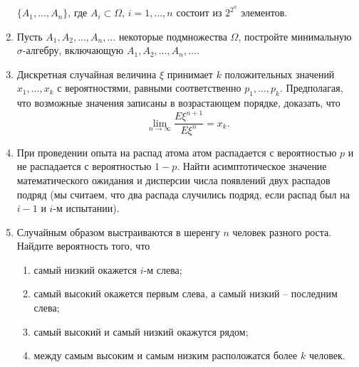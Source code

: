 \documentclass[a4paper, 14pt]{extarticle}
\begin{document}
\begin{enumerate}
	$\{A_1,\ldots, A_n\}$, где $A_i\subset\Omega$, $i = 1,\ldots, n$ состоит из $2^{2^n}$ элементов.
	\item Пусть $A_1,A_2,\ldots, A_n,\ldots$ некоторые подмножества $\Omega$, постройте минимальную $\sigma$-алгебру, включающую $A_1,A_2,\ldots, A_n,\ldots$.
	\item Дискретная случайная величина $\xi$ принимает $k$
	положительных значений $x_1,\ldots,x_k$ с вероятностями,
	равными соответственно $p_1,\ldots,p_k$. Предполагая, что
	возможные значения записаны в возрастающем порядке,
	доказать, что
	$$\lim_{n\rightarrow\infty}\frac{E\xi^{n+1}}{E\xi^n}=x_k. $$
	\item При проведении опыта на распад атома атом распадается с вероятностью $p$ и не распадается с вероятностью $1-p$. Найти асимптотическое значение математического ожидания и дисперсии числа появлений двух распадов подряд (мы считаем, что два распада случились подряд, если распад был на $i-1$ и $i$-м испытании).
	
\item Случайным образом выстраиваются в шеренгу $n$ человек разного
роста. Найдите вероятность того, что
\begin{enumerate}
	\item самый низкий окажется $i$-м слева;
	\item самый высокий окажется первым слева, а самый низкий -- последним слева;
	\item самый высокий и самый низкий окажутся рядом;
	\item между самым высоким и самым низким расположатся более $k$
человек.
\end{enumerate}

\end{enumerate}
\end{document}
